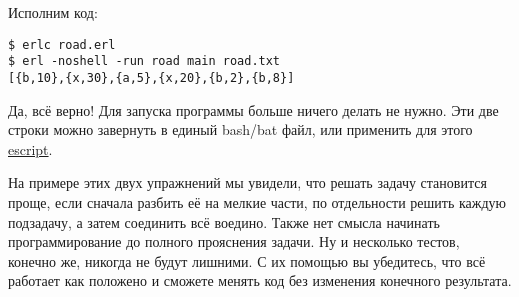 Исполним код:
\begin{lstlisting}[style=erlang]
$ erlc road.erl
$ erl -noshell -run road main road.txt
[{b,10},{x,30},{a,5},{x,20},{b,2},{b,8}]
\end{lstlisting}

Да, всё верно!
Для запуска программы больше ничего делать не нужно.
Эти две строки можно завернуть в единый bash/bat файл, или применить для этого \href{http://erlang.org/doc/man/escript.html}{escript}.

На примере этих двух упражнений мы увидели, что решать задачу становится проще, если сначала разбить её на мелкие части, по отдельности решить каждую подзадачу, а затем соединить всё воедино.
Также нет смысла начинать программирование до полного прояснения задачи.
Ну и несколько тестов, конечно же, никогда не будут лишними.
С их помощью вы убедитесь, что всё работает как положено и сможете менять код без изменения конечного результата.
